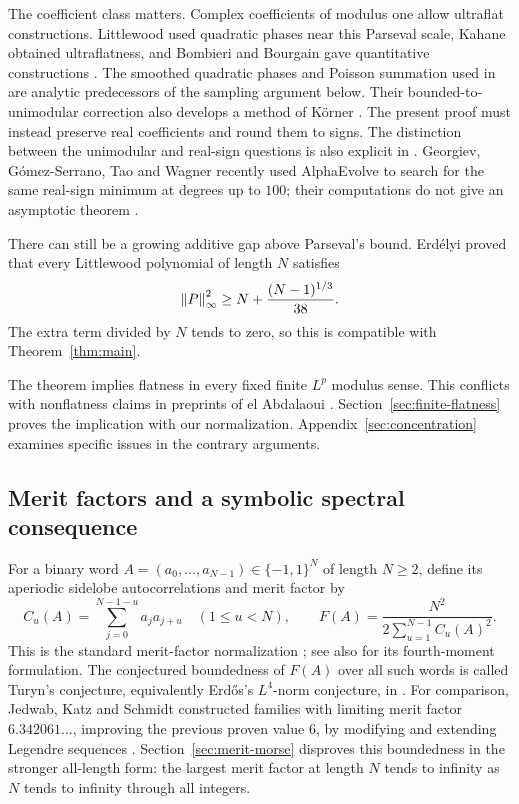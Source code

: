 The coefficient class matters. Complex coefficients of modulus one allow
ultraflat constructions. Littlewood used quadratic phases near this
Parseval scale, Kahane obtained ultraflatness, and Bombieri and Bourgain
gave quantitative constructions \cite{Littlewood1966,Kahane1980,BombieriBourgain2009}.
The smoothed quadratic phases and Poisson summation used in
\cite[Sections~2 and~7]{BombieriBourgain2009} are analytic predecessors
of the sampling argument below. Their bounded-to-unimodular correction
also develops a method of K\"orner
\cite[Section~8]{BombieriBourgain2009}. The present proof must instead
preserve real coefficients and round them to signs. The distinction
between the unimodular and real-sign questions is also explicit in
\cite[Problem 4.31]{HaymanLingham2018}.
Georgiev, G\'omez-Serrano, Tao and Wagner recently used AlphaEvolve to
search for the same real-sign minimum at degrees up to $100$;
their computations do not give an asymptotic theorem
\cite[Section 6.13]{GeorgievEtAl2025}.

There can still be a growing additive gap above Parseval's bound.
Erd\'elyi proved that every Littlewood polynomial of length $N$ satisfies
\cite[Theorem 2.1]{Erdelyi2026}
\[
 \left\lVert P\right\rVert_\infty^2\ge N+\frac{(N-1)^{1/3}}{38}.
\]
The extra term divided by $N$ tends to zero, so this is compatible with
Theorem~\ref{thm:main}.

The theorem implies flatness in every fixed finite $L^p$ modulus
sense. This conflicts with nonflatness claims in preprints of
el Abdalaoui \cite{ElAbdalaoui2017,ElAbdalaoui2025,ElAbdalaoui2025Generalization}.
Section~\ref{sec:finite-flatness} proves the implication with our
normalization. Appendix~\ref{sec:concentration} examines specific issues in
the contrary arguments.

\subsection{Merit factors and a symbolic spectral consequence}
For a binary word $A=(a_0,\ldots,a_{N-1})\in\{-1,1\}^N$ of length
$N\ge2$, define its aperiodic sidelobe autocorrelations and merit factor by
\[
 C_u(A)=\sum_{j=0}^{N-1-u}a_ja_{j+u}\quad(1\le u<N),
 \qquad
 F(A)=\frac{N^2}{2\sum_{u=1}^{N-1}C_u(A)^2}.
\]
This is the standard merit-factor normalization
\cite[Definition~2 and Lemma~0]{DownarowiczLacroix1998}; see also
\cite[Introduction]{JedwabKatzSchmidt2013} for its fourth-moment formulation.
The conjectured boundedness of $F(A)$ over all such words is called
Turyn's conjecture, equivalently Erd\H{o}s's $L^4$-norm conjecture, in
\cite[p.~3 of the author manuscript]{DownarowiczLacroix1998}.
For comparison, Jedwab, Katz and Schmidt constructed families with
limiting merit factor $6.342061\ldots$, improving the
previous proven value $6$, by modifying and extending Legendre sequences
\cite[Theorem~1.1 and Corollary~3.2]{JedwabKatzSchmidt2013}.
Section~\ref{sec:merit-morse} disproves this boundedness in the stronger
all-length form: the largest merit factor at length $N$ tends to infinity
as $N$ tends to infinity through all integers.

